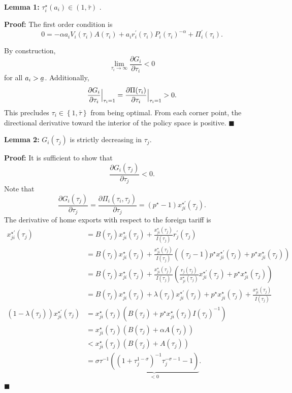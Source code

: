 \documentclass{puthesis}
\DeclareRobustCommand{\ubar}[1]{\underaccent{\bar}{#1}}
\begin{document}
\textbf{Lemma 1:} \(\tau_i^\star(a_i) \in (1, \bar{\tau})\) .

\textbf{Proof:} The first order condition is
\begin{equation} \label{eq:Gfoc}
0 = - \alpha a_i V_i(\tau_i) A(\tau_i) + a_i r_i^\prime(\tau_i) P_i(\tau_i)^{-\alpha} + \Pi_i^\prime(\tau_i) .
\end{equation}

By construction, \[
\lim_{\tau_i \rightarrow \infty} \frac{\partial G_i}{\partial \tau_i} < 0
\] for all \(a_i > \ubar{a}\). Additionally, \[
\evalat[\Big]{ \frac{\partial G_i}{\partial \tau_i} }{\tau_i=1} = \evalat[\Big]{ \frac{\partial \Pi(\tau_i)}{\partial \tau_i} }{\tau_i=1} > 0 .
\] This precludes \(\tau_i \in \left\{ 1, \bar{\tau} \right\}\) from
being optimal. From each corner point, the directional derivative toward
the interior of the policy space is positive. \(\blacksquare\)

\textbf{Lemma 2:} \(G_i(\tau_j)\) is strictly decreasing in \(\tau_j\).

\textbf{Proof:} It is sufficient to show that \[
\frac{\partial G_i(\tau_j)}{\partial \tau_{j}} < 0 .
\] Note that \[
\frac{\partial G_i(\tau_j)}{\partial \tau_{j}} = \frac{\partial \Pi_i(\tau_i, \tau_j)}{\partial \tau_j} = (p^\star - 1) x_{ji}^{\star \prime}(\tau_j) .
\] The derivative of home exports with respect to the foreign tariff is
\begin{align*}
x_{ji}^{\star \prime}(\tau_j) &= B(\tau_j) x_{ji}^\star(\tau_j) + \frac{x_{ji}^\star(\tau_j)}{I(\tau_j)} r_j^\prime(\tau_j) \\
&= B(\tau_j) x_{ji}^\star(\tau_j) + \frac{x_{ji}^\star(\tau_j)}{I(\tau_j)} \left( (\tau_j - 1) p^\star x_{ji}^{\star \prime}(\tau_j) + p^\star x_{ji}^\star(\tau_j) \right) \\
&= B(\tau_j) x_{ji}^\star(\tau_j) + \frac{x_{ji}^\star(\tau_j)}{I(\tau_j)} \left( \frac{r_j(\tau_j)}{x_{ji}^\star(\tau_j)} x_{ji}^{\star \prime}(\tau_j) + p^\star x_{ji}^\star(\tau_j) \right) \\
&= B(\tau_j) x_{ji}^\star(\tau_j) + \lambda(\tau_j) x_{ji}^{\star \prime}(\tau_j) + p^\star x_{ji}^\star(\tau_j) + \frac{x_{ji}^\star(\tau_j)}{I(\tau_j)} \\
(1 - \lambda(\tau_j)) x_{ji}^{\star \prime}(\tau_j)&= x_{ji}^\star(\tau_j) \left( B(\tau_j) + p^\star x_{ji}^\star(\tau_j) I(\tau_j)^{-1} \right) \\
&= x_{ji}^\star(\tau_j) \left( B(\tau_j) + \alpha A(\tau_j) \right) \\
&< x_{ji}^\star(\tau_j) \left( B(\tau_j) + A(\tau_j) \right) \\
&= \sigma \tau^{-1} \underbrace{\left( \left( 1 + \tau_j^{1-\sigma} \right)^{-1} \tau_j^{-\sigma - 1} - 1 \right)}_{<0} .
\end{align*} \(\blacksquare\)
\end{document}
